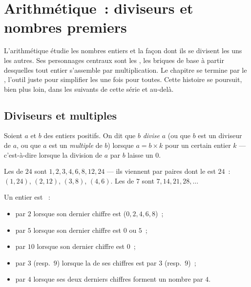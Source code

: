 \chapter{Arithmétique~: diviseurs et nombres premiers}\label{ch:g9:arith}

L'arithmétique étudie les nombres entiers et la façon dont ils se
divisent les uns les autres. Ses personnages centraux sont les , les briques de base à partir desquelles tout entier s'assemble
par multiplication. Le chapitre se termine par le , l'outil juste pour simplifier les  une fois pour
toutes. Cette histoire se poursuit, bien plus loin, dans les 
suivants de cette série et au-delà.

\section{Diviseurs et multiples}

\begin{definition}\label{def:g9:arith:divisor}
Soient $a$ et $b$ des entiers positifs. On dit que $b$
\emph{divise} $a$ (ou que $b$ est un diviseur de $a$,
ou que $a$ est un \emph{multiple} de $b$) lorsque
$a = b \times k$ pour un certain entier $k$ --- c'est-à-dire lorsque la
division de $a$ par $b$ laisse un  $0$.
\end{definition}

\begin{example}
Les  de $24$ sont $1, 2, 3, 4, 6, 8, 12, 24$ --- ils viennent
par paires dont le  est $24$~: $(1,24)$, $(2,12)$, $(3,8)$,
$(4,6)$. Les  de $7$ sont $7, 14, 21, 28, \dots$
\end{example}

\begin{proposition}\label{prop:g9:arith:rules}
Un entier est ~:
\begin{itemize}
  \item par $2$ lorsque son dernier chiffre est  ($0, 2, 4, 6, 8$)~;
  \item par $5$ lorsque son dernier chiffre est $0$ ou $5$~;
  \item par $10$ lorsque son dernier chiffre est $0$~;
  \item par $3$ (resp.\ $9$) lorsque la  de ses chiffres est
         par $3$ (resp.\ $9$)~;
  \item par $4$ lorsque ses deux derniers chiffres forment un nombre
         par $4$.
\end{itemize}
\end{proposition}
\admitted

